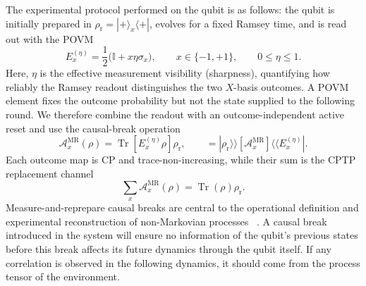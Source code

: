 The experimental protocol performed on the qubit is as follows: the qubit is initially prepared in $\rho_{\mathrm r}=|+\rangle_x\langle+|$, evolves for a fixed Ramsey time, and is read out with the POVM
%
\begin{equation}
    E_x^{(\eta)}
    =\frac{1}{2}\bigl(\mathbb I+x\eta\sigma_x\bigr),
    \qquad
    x\in\{-1,+1\},
    \qquad
    0\leq\eta\leq1.
    \label{eq:ramsey-povm}
\end{equation}
%
Here, \(\eta\) is the effective measurement visibility (sharpness), quantifying how reliably the Ramsey readout distinguishes the two \(X\)-basis outcomes. 
A POVM element fixes the outcome probability but not the state supplied to the following round.  
We therefore combine the readout with an outcome-independent active reset and use the causal-break operation
%
\begin{equation}
    \mathcal A_x^{\mathrm{MR}}(\rho)
    =\operatorname{Tr}\!\left[E_x^{(\eta)}\rho\right]\rho_{\mathrm r},
    \qquad
    =|\rho_{\mathrm r}\rangle\!\rangle
    [\mathcal A_x^{\mathrm{MR}}]
      \langle\!\langle E_x^{(\eta)}|.
    \label{eq:ramsey-measure-reset}
\end{equation}
%
Each outcome map is CP and trace-non-increasing, while their sum is the CPTP replacement channel
%
\begin{equation}
    \sum_x\mathcal A_x^{\mathrm{MR}}(\rho)
    =\operatorname{Tr}(\rho)\rho_{\mathrm r}.
    \label{eq:ramsey-complete-instrument}
\end{equation}
%
Measure-and-reprepare causal breaks are central to the operational definition and experimental reconstruction of non-Markovian processes ~\cite{Pollock2018Framework,White2020,White2022ProcessTomography}. 
A causal break introduced in the system will ensure no information of the qubit's previous states before this break affects its future dynamics through the qubit itself. 
If any correlation is observed in the following dynamics, it should come from the process tensor of the environment. 

